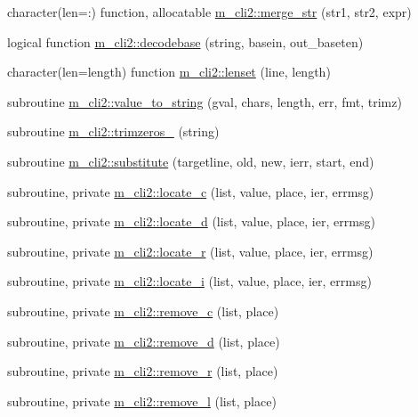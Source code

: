 \begin{DoxyCompactItemize}
\item 
character(len=\+:) function, allocatable \mbox{\hyperlink{namespacem__cli2_a8e172feb2e4ae4d21d4fceb4e54f593c}{m\+\_\+cli2\+::merge\+\_\+str}} (str1, str2, expr)
\item 
logical function \mbox{\hyperlink{namespacem__cli2_a1029304d495b2bf791e03cfab5983bbb}{m\+\_\+cli2\+::decodebase}} (string, basein, out\+\_\+baseten)
\item 
character(len=length) function \mbox{\hyperlink{namespacem__cli2_ad13853611abfee00d40ffa020662ec8a}{m\+\_\+cli2\+::lenset}} (line, length)
\item 
subroutine \mbox{\hyperlink{namespacem__cli2_a1bbcefd886dabb0286e2cb14ab54034f}{m\+\_\+cli2\+::value\+\_\+to\+\_\+string}} (gval, chars, length, err, fmt, trimz)
\item 
subroutine \mbox{\hyperlink{namespacem__cli2_a770a66475094fd80493d46498de1ebf7}{m\+\_\+cli2\+::trimzeros\+\_\+}} (string)
\item 
subroutine \mbox{\hyperlink{namespacem__cli2_a76af7f7c39e6755e024890d85d488704}{m\+\_\+cli2\+::substitute}} (targetline, old, new, ierr, start, end)
\item 
subroutine, private \mbox{\hyperlink{namespacem__cli2_a2199778fea512efcde8778f20765643a}{m\+\_\+cli2\+::locate\+\_\+c}} (list, value, place, ier, errmsg)
\item 
subroutine, private \mbox{\hyperlink{namespacem__cli2_a0e859cd8635ab617ea9a4e9b4ffca852}{m\+\_\+cli2\+::locate\+\_\+d}} (list, value, place, ier, errmsg)
\item 
subroutine, private \mbox{\hyperlink{namespacem__cli2_a2e12eb8c0ae6ce90b821141699e627df}{m\+\_\+cli2\+::locate\+\_\+r}} (list, value, place, ier, errmsg)
\item 
subroutine, private \mbox{\hyperlink{namespacem__cli2_a3cc41a1a629f9ab278376a71b243673d}{m\+\_\+cli2\+::locate\+\_\+i}} (list, value, place, ier, errmsg)
\item 
subroutine, private \mbox{\hyperlink{namespacem__cli2_a155af513c048d68552ec2e8fb54e1294}{m\+\_\+cli2\+::remove\+\_\+c}} (list, place)
\item 
subroutine, private \mbox{\hyperlink{namespacem__cli2_a5deb6a427a39e04c5a18a82497d5cf84}{m\+\_\+cli2\+::remove\+\_\+d}} (list, place)
\item 
subroutine, private \mbox{\hyperlink{namespacem__cli2_a281edafaa6f74c30bd8de6d0c1d05be6}{m\+\_\+cli2\+::remove\+\_\+r}} (list, place)
\item 
subroutine, private \mbox{\hyperlink{namespacem__cli2_ae3fc38d25a8a4892bde95a7198c2495a}{m\+\_\+cli2\+::remove\+\_\+l}} (list, place)

\end{DoxyCompactItemize}
